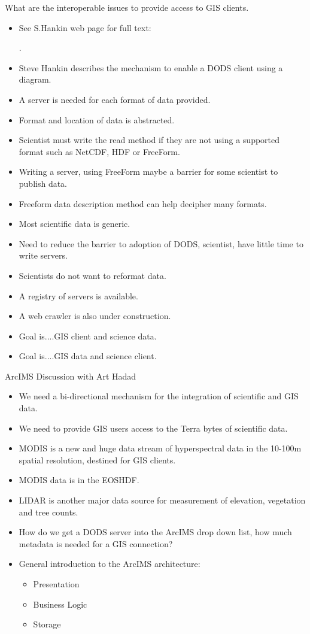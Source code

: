         What are the interoperable issues to provide access to GIS clients.

\begin{itemize}
\item See S.Hankin web page for full text: 

.
\item Steve Hankin describes the mechanism to enable a DODS client using a diagram.
\item A server is needed for each format of data provided.
\item Format and location of data is abstracted.
\item Scientist must write the read method if they are not using a supported format such as 
NetCDF, HDF or FreeForm.
\item Writing a server, using FreeForm maybe a barrier for some scientist to publish data.
\item Freeform data description method can help decipher many formats.
\item Most scientific data is generic.
\item Need to reduce the barrier to adoption of DODS, scientist, have little time to write 
servers.
\item Scientists do not want to reformat data.
\item A registry of servers is available.
\item A web crawler is also under construction.
\item Goal is....GIS client and science data.
\item Goal is....GIS data and science client.
\end{itemize}


ArcIMS Discussion with Art Hadad

\begin{itemize}
\item We need a bi-directional mechanism for the integration of scientific and GIS data.
\item We need to provide GIS users access to the Terra bytes of scientific data.
\item MODIS is a new and huge data stream of hyperspectral data in the 10-100m spatial 
resolution, destined for GIS clients.
\item MODIS data is in the EOSHDF.
\item LIDAR is another major data source for measurement of elevation, vegetation and tree 
counts.
\item How do we get a DODS server into the ArcIMS drop down list, how much metadata is 
needed for a GIS connection?
\item General introduction to the ArcIMS architecture:
\begin{itemize}
\item Presentation
\item Business Logic
\item Storage
\end{itemize}
\end{itemize}


